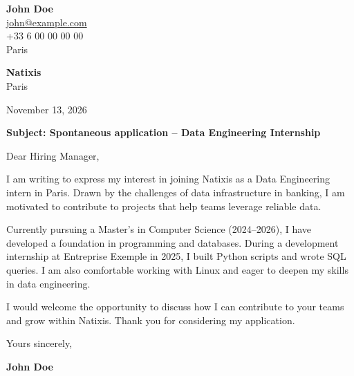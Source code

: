 \documentclass[11pt,a4paper]{article}
\begin{document}
{\Large\bfseries John Doe}\\[0.3cm]


\href{mailto:john@example.com}{john@example.com}\\



+33 6 00 00 00 00\\



Paris\\


\vspace{1cm}

\begin{flushright}

\textbf{Natixis}\\



Paris\\


\vspace{0.5cm}

November 13, 2026

\end{flushright}

\vspace{0.8cm}

\textbf{Subject: Spontaneous application – Data Engineering Internship}

\vspace{0.6cm}


Dear Hiring Manager,


\vspace{0.5cm}

\justifying


I am writing to express my interest in joining Natixis as a Data Engineering intern in Paris. Drawn by the challenges of data infrastructure in banking, I am motivated to contribute to projects that help teams leverage reliable data.

\par

Currently pursuing a Master’s in Computer Science (2024–2026), I have developed a foundation in programming and databases. During a development internship at Entreprise Exemple in 2025, I built Python scripts and wrote SQL queries. I am also comfortable working with Linux and eager to deepen my skills in data engineering.

\par

I would welcome the opportunity to discuss how I can contribute to your teams and grow within Natixis. Thank you for considering my application.

\par


\vspace{0.7cm}


Yours sincerely,


\vspace{0.5cm}

\textbf{John Doe}
\end{document}
